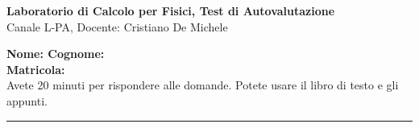 \documentclass[11pt]{article}
\begin{document}
\pagestyle{empty}

\begin{center}
{\Large \bf  Laboratorio di Calcolo per Fisici, Test di Autovalutazione\\[2mm]}
{\large Canale L-PA, Docente: Cristiano De Michele}
\end{center}
\vspace{4mm}

\begin{mdframed}[backgroundcolor=panna]
{\bf Nome: \qquad \qquad \qquad\qquad \qquad \qquad Cognome:}\\
\newline
{\bf Matricola:}\\
Avete 20 minuti per rispondere alle domande. Potete usare il libro di testo e gli appunti.
\end{mdframed}
%
%

\hrule
\vspace{2mm}
\end{document}
